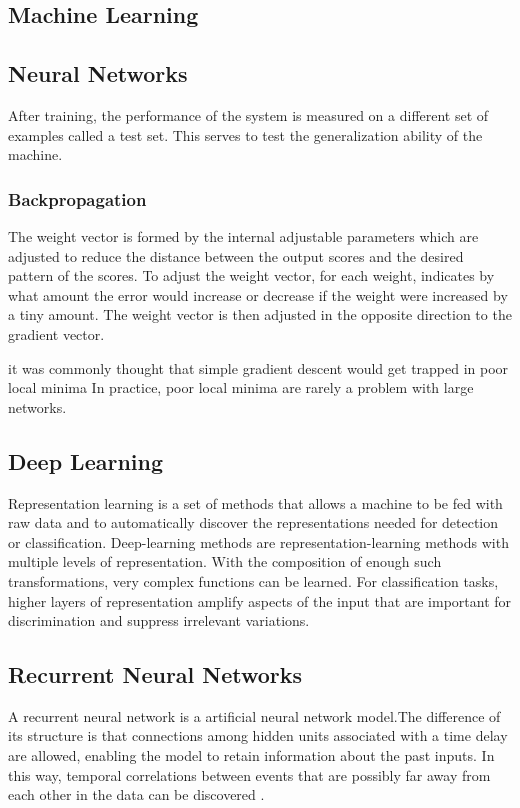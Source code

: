 \subsection{Machine Learning}

\subsection{Neural Networks}
After training, the performance of the system is measured on a different set of examples called a test set. This serves to test the generalization ability of the machine\cite{lecun2015deep}.
\subsubsection{Backpropagation}
	The weight vector is formed by the internal adjustable parameters which are adjusted to reduce the distance between the output scores and the desired pattern of the scores. To adjust the weight vector, for each weight, indicates by what amount the error would increase or decrease if the weight were increased by a tiny amount. The weight vector is then adjusted in the opposite direction to the gradient vector\cite{lecun2015deep}.

it was commonly thought that simple gradient descent would get trapped in poor local
minima In practice, poor local minima are rarely a problem with large networks.\cite{lecun2015deep}



\subsection{Deep Learning}
Representation learning is a set of methods that allows a machine to be fed with raw data and to automatically discover the representations needed for detection or classification. Deep-learning methods are representation-learning methods with multiple levels of representation. With the composition of enough such transformations, very complex functions can be learned. For classification tasks, higher layers of representation amplify aspects of the input that are important for discrimination and suppress irrelevant variations\cite{lecun2015deep}.


\subsection{Recurrent Neural Networks}
A recurrent neural network is a artificial neural network model.The difference of its structure is that connections among hidden units associated with a time delay are allowed, enabling the model to retain information about the past inputs. In this way, temporal correlations between events that are possibly far away from each other in the data can be discovered \cite{pascanu2013difficulty}. 

